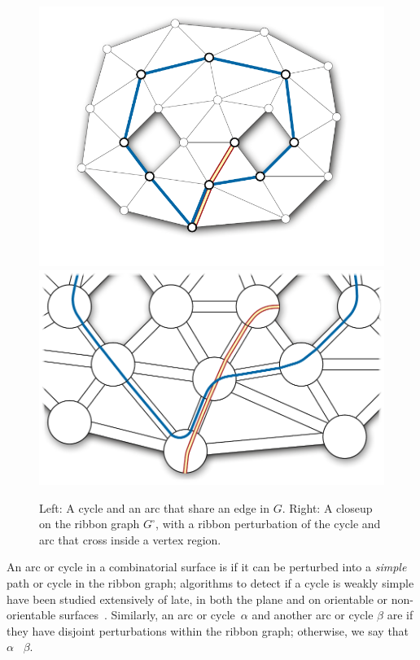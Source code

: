 \documentclass[letterpaper,review]{siamart190516}
\begin{document}
\begin{figure}[htb]
\centering
\includegraphics[scale=0.45]{Fig/pants-ribbon}\hfil
\includegraphics[scale=0.45]{Fig/pants-ribbon-2}
\caption{Left: A cycle and an arc that share an edge in $G$.  Right: A closeup on the ribbon graph $G^\square$, with a ribbon perturbation of the cycle and arc that cross inside a vertex region.}
\label{F:ribbon}
\end{figure}

An arc or cycle in a combinatorial surface is  if it can be perturbed into a \emph{simple} path or cycle in the ribbon graph; algorithms to detect if a cycle is weakly simple have been studied extensively of late, in both the plane and on orientable or non-orientable surfaces~\cite{cex-dwsp-15,aaet-rwsp-17}.
Similarly, an arc or cycle~$\alpha$ and another arc or cycle $\beta$ are  if they have disjoint perturbations within the ribbon graph; otherwise, we say that $\alpha$ ~$\beta$.
\end{document}
